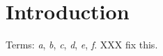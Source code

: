 \section{Introduction}
Terms: \emph{a}, \emph{b}, \emph{c}, \textit{d}, \emph{e}, \emph{f}.
 XXX fix this. %
